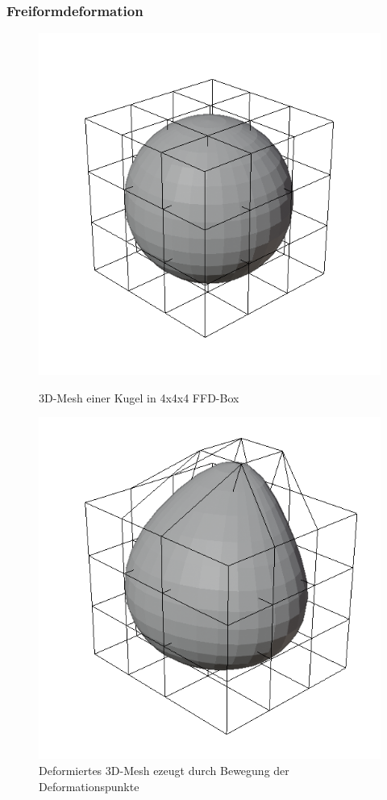 \subsubsection{Freiformdeformation}
\label{sub:ffd}
\begin{figure}[h]
	\centering
	\begin{minipage}{0.45\textwidth}
		\centering
		\includegraphics[width=1\linewidth]{bilder/sphere_lattice}
		\caption{3D-Mesh einer Kugel in 4x4x4 FFD-Box}
		\label{fig:ffd_undeformed}
	\end{minipage}\hfill
	\begin{minipage}{0.45\textwidth}
		\centering
		\includegraphics[width=1\linewidth]{bilder/sphere_lattice_deformed2}
		\caption{Deformiertes 3D-Mesh ezeugt durch Bewegung der Deformationspunkte}
		\label{fig:ffd_deformed}
	\end{minipage}
\end{figure}
